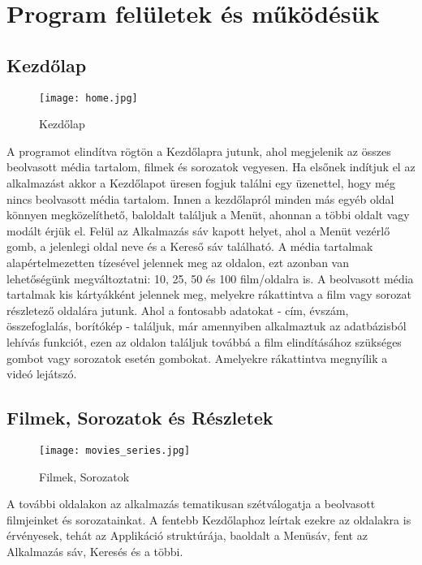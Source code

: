 \cleardoublepage
\section{Program felületek és működésük}

\subsection{Kezdőlap}
\begin{figure}[H]
	\centering
	\texttt{[image: home.jpg]}
	\caption{Kezdőlap}
	\label{fig:home}
\end{figure}
A programot elindítva rögtön a Kezdőlapra jutunk, ahol megjelenik az összes beolvasott média tartalom, filmek és sorozatok vegyesen. Ha elsőnek indítjuk el az alkalmazást akkor a Kezdőlapot üresen fogjuk találni egy üzenettel, hogy még nincs beolvasott média tartalom. Innen a kezdőlapról minden más egyéb oldal könnyen megközelíthető, baloldalt találjuk a Menüt, ahonnan a többi oldalt vagy modált érjük el. Felül az Alkalmazás sáv kapott helyet, ahol a Menüt vezérlő gomb, a jelenlegi oldal neve és a Kereső sáv található. A média tartalmak alapértelmezetten tízesével jelennek meg az oldalon, ezt azonban van lehetőségünk megváltoztatni: 10, 25, 50 és 100 film/oldalra is. A beolvasott média tartalmak kis kártyákként jelennek meg, melyekre rákattintva a film vagy sorozat részletező oldalára jutunk. Ahol a fontosabb adatokat - cím, évszám, összefoglalás, borítókép - találjuk, már amennyiben alkalmaztuk az adatbázisból lehívás funkciót, ezen az oldalon találjuk továbbá a film elindításához szükséges gombot vagy sorozatok esetén gombokat. Amelyekre rákattintva megnyílik a videó lejátszó.

\cleardoublepage
\subsection{Filmek, Sorozatok és Részletek}
\begin{figure}[H]
	\centering
	\texttt{[image: movies\_series.jpg]}
	\caption{Filmek, Sorozatok}
	\label{fig:movies_series}
\end{figure}
A további oldalakon az alkalmazás tematikusan szétválogatja a beolvasott filmjeinket és sorozatainkat. A fentebb Kezdőlaphoz leírtak ezekre az oldalakra is érvényesek, tehát az Applikáció struktúrája, baoldalt a Menüsáv, fent az Alkalmazás sáv, Keresés és a többi.


